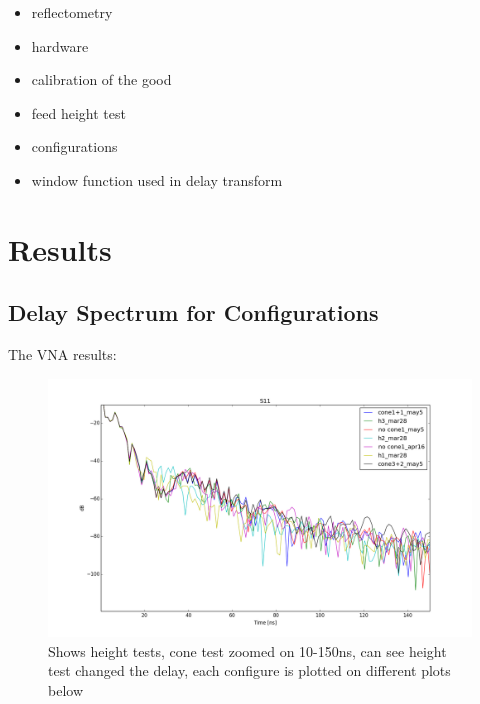 \documentclass[preprint]{aastex}  %
\begin{document}
\begin{itemize}
\item reflectometry 
\item hardware 
\item calibration of the good
\item feed height test
\item configurations
\item window function used in delay transform
\end{itemize}

\section{Results}
\label{sec:results}
\subsection{Delay Spectrum for Configurations}
The VNA results:

\begin{figure}[H]
	\begin{center}
	\includegraphics[width =\textwidth]{./reflectometry_plots/configcompare10-150ns}
	\caption{Shows height tests, cone test zoomed on 10-150ns, can see height test changed the delay, each configure is plotted on different plots below
\label{Fig:} }
	\end{center}
\end{figure}
\end{document}
